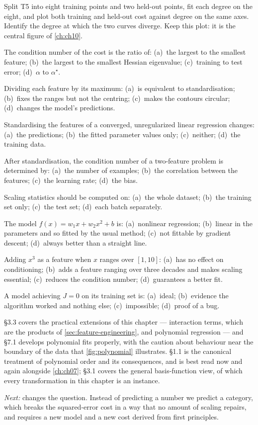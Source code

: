 \pe Split T5 into eight training points and two held-out points, fit each degree
on the eight, and plot both training and held-out cost against degree on the same
axes. Identify the degree at which the two curves diverge. Keep this plot: it is
the central figure of \cref{ch:ch10}.


\qz The condition number of the cost is the ratio of: (a)~the largest to the
smallest feature; (b)~the largest to the smallest Hessian eigenvalue;
(c)~training to test error; (d)~$\alpha$ to $\alpha^\star$.

\qz Dividing each feature by its maximum: (a)~is equivalent to standardisation;
(b)~fixes the ranges but not the centring; (c)~makes the contours circular;
(d)~changes the model's predictions.

\qz Standardising the features of a converged, unregularized linear regression
changes: (a)~the predictions; (b)~the fitted parameter values only;
(c)~neither; (d)~the training data.

\qz After standardisation, the condition number of a two-feature problem is
determined by: (a)~the number of examples; (b)~the correlation between the
features; (c)~the learning rate; (d)~the bias.

\qz Scaling statistics should be computed on: (a)~the whole dataset; (b)~the
training set only; (c)~the test set; (d)~each batch separately.

\qz The model $f(x) = w_1x + w_2x^2 + b$ is: (a)~nonlinear regression;
(b)~linear in the parameters and so fitted by the usual method; (c)~not fittable
by gradient descent; (d)~always better than a straight line.

\qz Adding $x^3$ as a feature when $x$ ranges over $[1,10]$: (a)~has no effect on
conditioning; (b)~adds a feature ranging over three decades and makes scaling
essential; (c)~reduces the condition number; (d)~guarantees a better fit.

\qz A model achieving $J = 0$ on its training set is: (a)~ideal; (b)~evidence
the algorithm worked and nothing else; (c)~impossible; (d)~proof of a bug.

\furtherreading

\textcite{james2021} §3.3 covers the practical extensions of this chapter ---
interaction terms, which are the products of \cref{sec:feature-engineering}, and
polynomial regression --- and §7.1 develops polynomial fits properly, with the
caution about behaviour near the boundary of the data that
\cref{fig:polynomial} illustrates. \textcite{bishop2006} §1.1 is the canonical
treatment of polynomial order and its consequences, and is best read now and
again alongside \cref{ch:ch07}; §3.1 covers the general basis-function view, of
which every transformation in this chapter is an instance.

\bigskip
\noindent\emph{Next:}  changes the question. Instead of predicting
a number we predict a category, which breaks the squared-error cost in a way that
no amount of scaling repairs, and requires a new model and a new cost derived
from first principles.
